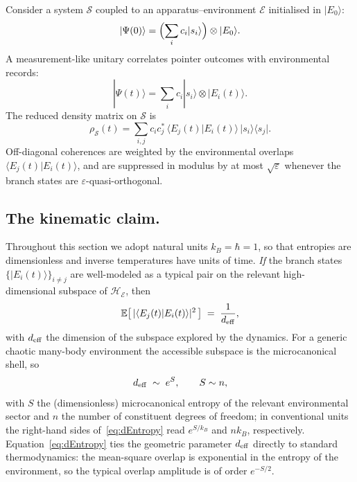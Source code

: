 \documentclass[aps,pra,reprint,superscriptaddress,nofootinbib,longbibliography]{revtex4-2}
\newcommand{\bra}[1]{\langle #1 |}
\newcommand{\ket}[1]{| #1 \rangle}
\newcommand{\braket}[2]{\langle #1 | #2 \rangle}
\newcommand{\HH}{\mathcal{H}}
\newcommand{\EE}{\mathcal{E}}
\newcommand{\SSys}{\mathcal{S}}
\newcommand{\E}{\mathbb{E}}
\begin{document}
Consider a system $\SSys$ coupled to an apparatus--environment $\EE$ initialised in $\ket{E_0}$:
\begin{equation}
    \ket{\Psi(0)} = \Bigl(\sum_i c_i \ket{s_i}\Bigr)\otimes\ket{E_0}.
\end{equation}
A measurement-like unitary correlates pointer outcomes with environmental records:
\begin{equation}
    \ket{\Psi(t)} = \sum_i c_i \ket{s_i}\otimes\ket{E_i(t)}.
\end{equation}
The reduced density matrix on $\SSys$ is
\begin{equation}
    \rho_{\SSys}(t) = \sum_{i,j} c_i c_j^{*}\,\braket{E_j(t)}{E_i(t)}\,\ket{s_i} \bra{s_j}.
\end{equation}
Off-diagonal coherences are weighted by the environmental overlaps
$\braket{E_j(t)}{E_i(t)}$, and are suppressed in modulus by at most
$\sqrt{\varepsilon}$ whenever the branch states are $\varepsilon$-quasi-orthogonal.

\subsection*{The kinematic claim.}
Throughout this section we adopt natural units $k_B=\hbar=1$, so that entropies are dimensionless and inverse temperatures have units of time. \emph{If} the branch states $\{\ket{E_i(t)}\}_{i\ne j}$ are well-modeled as a typical pair on the relevant high-dimensional subspace of $\HH_{\EE}$, then
\begin{equation}
    \E\bigl[\,|\braket{E_j(t)}{E_i(t)}|^2\,\bigr] \;=\; \frac{1}{d_{\rm eff}},
\end{equation}
with $d_{\rm eff}$ the dimension of the subspace explored by the dynamics. For a generic chaotic many-body environment the accessible subspace is the microcanonical shell, so
\begin{equation}
    d_{\rm eff} \;\sim\; e^{S},
    \qquad S \sim n,
    \label{eq:dEntropy}
\end{equation}
with $S$ the (dimensionless) microcanonical entropy of the relevant environmental sector and $n$ the number of constituent degrees of freedom; in conventional units the right-hand sides of~\eqref{eq:dEntropy} read $e^{S/k_B}$ and $nk_B$, respectively. Equation~\eqref{eq:dEntropy} ties the geometric parameter $d_{\rm eff}$ directly to standard thermodynamics: the mean-square overlap is exponential in the entropy of the environment, so the typical overlap amplitude is of order $e^{-S/2}$.
\end{document}
